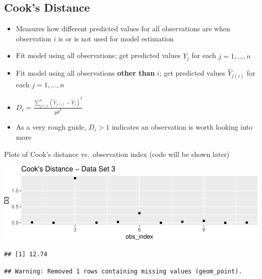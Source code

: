 \documentclass[]{extarticle}
\newenvironment{Shaded}{\begin{snugshade}}{\end{snugshade}}
\newcommand{\DecValTok}[1]{\textcolor[rgb]{0.00,0.00,0.81}{#1}}
\newcommand{\CommentTok}[1]{\textcolor[rgb]{0.56,0.35,0.01}{\textit{#1}}}
\newcommand{\OperatorTok}[1]{\textcolor[rgb]{0.81,0.36,0.00}{\textbf{#1}}}
\newcommand{\NormalTok}[1]{#1}
\providecommand{\tightlist}{%
  \setlength{\itemsep}{0pt}\setlength{\parskip}{0pt}}
\begin{document}
\newpage

\subsection{Cook's Distance}\label{cooks-distance}

\begin{itemize}
\tightlist
\item
  Measures how different predicted values for all observations are when
  observation \(i\) is or is not used for model estimation
\item
  Fit model using all observations; get predicted values \(\hat{Y}_j\)
  for each \(j = 1, \ldots, n\)
\item
  Fit model using all observations \textbf{other than} \(i\); get
  predicted values \(\hat{Y}_{j(i)}\) for each \(j = 1, \ldots, n\)
\item
  \(D_i = \frac{\sum_{j = 1}^n (\hat{Y}_{j(i)} - \hat{Y}_j)^2}{p \hat{\sigma}^2}\)
\item
  As a very rough guide, \(D_i > 1\) indicates an observation is worth
  looking into more
\end{itemize}

Plots of Cook's distance vs.~observation index (code will be shown
later)

\includegraphics{20190417_residual_diagnostics_files/figure-latex/unnamed-chunk-10-1.pdf}

\begin{Shaded}
\end{Shaded}

\begin{verbatim}
## [1] 12.74
\end{verbatim}

\begin{verbatim}
## Warning: Removed 1 rows containing missing values (geom_point).
\end{verbatim}
\end{document}
